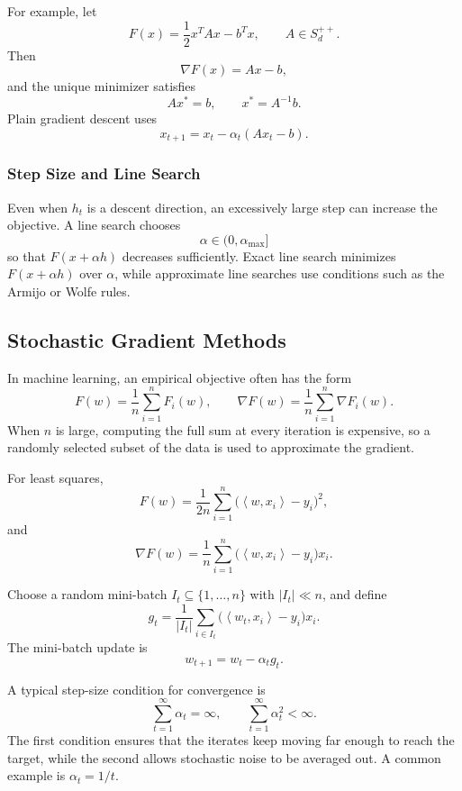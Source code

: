 \documentclass[12pt,oneside]{book}
\numberwithin{equation}{section}
\theoremstyle{definition}
\theoremstyle{plain}
\theoremstyle{remark}
\newcommand{\inner}[2]{\left\langle #1, #2 \right\rangle}
\begin{document}
For example, let
\[
F(x)=\frac{1}{2}x^TAx-b^Tx,
\qquad A\in S_d^{++}.
\]
Then
\[
\nabla F(x)=Ax-b,
\]
and the unique minimizer satisfies
\[
Ax^*=b,
\qquad
x^*=A^{-1}b.
\]
Plain gradient descent uses
\[
x_{t+1}=x_t-\alpha_t(Ax_t-b).
\]

\subsubsection{Step Size and Line Search}
Even when $h_t$ is a descent direction, an excessively large step can increase the objective. A line search chooses
\[
\alpha\in(0,\alpha_{\max}]
\]
so that $F(x+\alpha h)$ decreases sufficiently. Exact line search minimizes $F(x+\alpha h)$ over $\alpha$, while approximate line searches use conditions such as the Armijo or Wolfe rules.

\subsection{Stochastic Gradient Methods}
In machine learning, an empirical objective often has the form
\[
F(w)=\frac{1}{n}\sum_{i=1}^nF_i(w),
\qquad
\nabla F(w)=\frac{1}{n}\sum_{i=1}^n\nabla F_i(w).
\]
When $n$ is large, computing the full sum at every iteration is expensive, so a randomly selected subset of the data is used to approximate the gradient.

For least squares,
\[
F(w)=\frac{1}{2n}\sum_{i=1}^n
\bigl(\inner{w}{x_i}-y_i\bigr)^2,
\]
and
\[
\nabla F(w)=\frac{1}{n}\sum_{i=1}^n
\bigl(\inner{w}{x_i}-y_i\bigr)x_i.
\]

Choose a random mini-batch $I_t\subseteq\{1,\ldots,n\}$ with $\lvert I_t\rvert\ll n$, and define
\[
g_t=\frac{1}{\lvert I_t\rvert}
\sum_{i\in I_t}
\bigl(\inner{w_t}{x_i}-y_i\bigr)x_i.
\]
The mini-batch update is
\[
w_{t+1}=w_t-\alpha_tg_t.
\]

A typical step-size condition for convergence is
\[
\sum_{t=1}^{\infty}\alpha_t=\infty,
\qquad
\sum_{t=1}^{\infty}\alpha_t^2<\infty.
\]
The first condition ensures that the iterates keep moving far enough to reach the target, while the second allows stochastic noise to be averaged out. A common example is $\alpha_t=1/t$.
\end{document}
